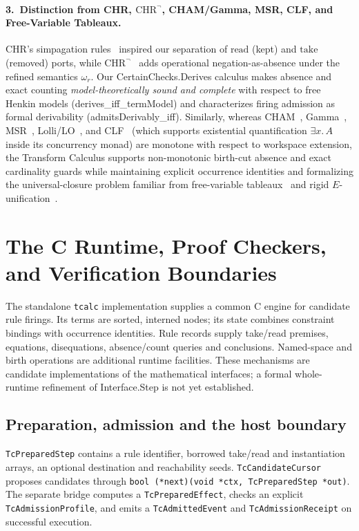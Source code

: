 \documentclass[11pt,a4paper]{article}
\theoremstyle{definition}
\DeclareRobustCommand{\lean}[1]{%
  \ifmmode\text{\normalfont\ttfamily\footnotesize\detokenize{#1}}%
  \else{\normalfont\footnotesize\leanurl{#1}}\fi}
\def\lean#1{#1}%
\begin{document}
\paragraph{3.\ Distinction from CHR, $\text{CHR}^\neg$, CHAM/Gamma, MSR, CLF, and Free-Variable Tableaux.}
CHR's simpagation rules~\cite{Fruhwirth2009CHR} inspired our separation of $\mathrm{read}$ (kept) and $\mathrm{take}$ (removed) ports, while $\text{CHR}^\neg$~\cite{VanWeert2006CHRneg} adds operational negation-as-absence under the refined semantics $\omega_r$. Our \lean{CertainChecks.Derives} calculus makes absence and exact counting \emph{model-theoretically sound and complete} with respect to free Henkin models (\lean{derives_iff_termModel}) and characterizes firing admission as formal derivability (\lean{admitsDerivably_iff}). Similarly, whereas CHAM~\cite{BerryBoudol1992CHAM}, Gamma~\cite{BanatreLeMetayer1990Gamma}, MSR~\cite{Cervesato2000MSR}, Lolli/LO~\cite{HodasMiller1994Lolli,AndreoliPareschi1991LO}, and CLF~\cite{Cervesato2002CLF} (which supports existential quantification $\exists x.\, A$ inside its concurrency monad) are monotone with respect to workspace extension, the Transform Calculus supports non-monotonic birth-cut absence and exact cardinality guards while maintaining explicit occurrence identities and formalizing the universal-closure problem familiar from free-variable tableaux~\cite{Fitting1996Tableaux,Hahnle2001Tableaux} and rigid $E$-unification~\cite{Gallier1992Rigid}.

\section{The C Runtime, Proof Checkers, and Verification Boundaries}
\label{sec:tcalc}

The standalone \texttt{tcalc} implementation supplies a common C engine for
candidate rule firings. Its terms are sorted, interned nodes; its state combines
constraint bindings with occurrence identities. Rule records supply take/read
premises, equations, disequations, absence/count queries and conclusions.
Named-space and birth operations are additional runtime facilities. These
mechanisms are candidate implementations of the mathematical interfaces;
a formal whole-runtime refinement of \lean{Interface.Step} is not yet established.

\subsection{Preparation, admission and the host boundary}
\texttt{TcPreparedStep} contains a rule identifier, borrowed take/read and
instantiation arrays, an optional destination and reachability seeds.
\texttt{TcCandidateCursor} proposes candidates through
\texttt{bool (*next)(void *ctx, TcPreparedStep *out)}.
The separate bridge computes a \texttt{TcPreparedEffect}, checks an explicit
\texttt{TcAdmissionProfile}, and emits a \texttt{TcAdmittedEvent} and
\texttt{TcAdmissionReceipt} on successful execution.
\end{document}
